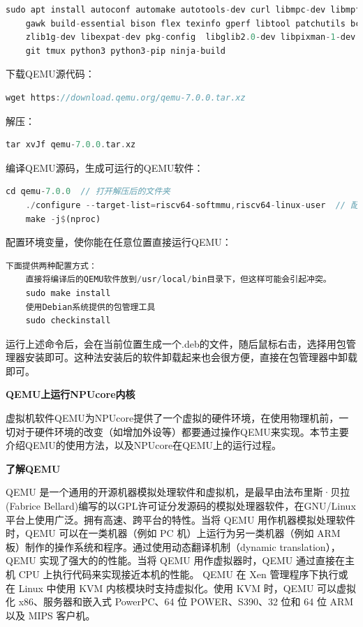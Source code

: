 \begin{lstlisting}[language={Rust}, label={code:forktest},
	caption={forktest.rs}]
	sudo apt install autoconf automake autotools-dev curl libmpc-dev libmpfr-dev libgmp-dev \
	gawk build-essential bison flex texinfo gperf libtool patchutils bc \
	zlib1g-dev libexpat-dev pkg-config  libglib2.0-dev libpixman-1-dev libsdl2-dev \
	git tmux python3 python3-pip ninja-build
\end{lstlisting}

下载QEMU源代码：

\begin{lstlisting}[language={Rust}, label={code:forktest},
	caption={forktest.rs}]
	wget https://download.qemu.org/qemu-7.0.0.tar.xz
\end{lstlisting}

解压：
\begin{lstlisting}[language={Rust}, label={code:forktest},
	caption={forktest.rs}]
	tar xvJf qemu-7.0.0.tar.xz
\end{lstlisting}
编译QEMU源码，生成可运行的QEMU软件：

\begin{lstlisting}[language={Rust}, label={code:forktest},
	caption={forktest.rs}]
	cd qemu-7.0.0  // 打开解压后的文件夹
	./configure --target-list=riscv64-softmmu,riscv64-linux-user  // 配置编译选项
	make -j$(nproc)
\end{lstlisting}

配置环境变量，使你能在任意位置直接运行QEMU：

\begin{lstlisting}[language={Rust}, label={code:forktest},
	caption={forktest.rs}]
	下面提供两种配置方式：
	直接将编译后的QEMU软件放到/usr/local/bin目录下，但这样可能会引起冲突。
	sudo make install
	使用Debian系统提供的包管理工具
	sudo checkinstall
\end{lstlisting}

运行上述命令后，会在当前位置生成一个.deb的文件，随后鼠标右击，选择用包管理器安装即可。这种法安装后的软件卸载起来也会很方便，直接在包管理器中卸载即可。

\textbf{QEMU上运行NPUcore内核}

虚拟机软件QEMU为NPUcore提供了一个虚拟的硬件环境，在使用物理机前，一切对于硬件环境的改变（如增加外设等）都要通过操作QEMU来实现。本节主要介绍QEMU的使用方法，以及NPUcore在QEMU上的运行过程。

\textbf{了解QEMU}

QEMU 是一个通用的开源机器模拟处理软件和虚拟机，是最早由法布里斯·贝拉(Fabrice Bellard)编写的以GPL许可证分发源码的模拟处理器软件，在GNU/Linux平台上使用广泛。拥有高速、跨平台的特性。当将 QEMU 用作机器模拟处理软件时，QEMU 可以在一类机器（例如 PC 机）上运行为另一类机器（例如 ARM 板）制作的操作系统和程序。通过使用动态翻译机制（dynamic translation），QEMU 实现了强大的的性能。当将 QEMU 用作虚拟器时，QEMU 通过直接在主机 CPU 上执行代码来实现接近本机的性能。 QEMU 在 Xen 管理程序下执行或在 Linux 中使用 KVM 内核模块时支持虚拟化。使用 KVM 时，QEMU 可以虚拟化 x86、服务器和嵌入式 PowerPC、64 位 POWER、S390、32 位和 64 位 ARM 以及 MIPS 客户机。

